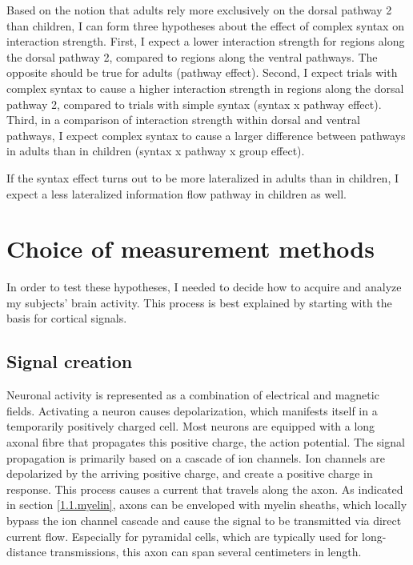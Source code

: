 Based on the notion that adults rely more exclusively on the dorsal pathway 2 than children, I can form three hypotheses about the effect of complex syntax on interaction strength.
First, I expect a lower interaction strength for regions along the dorsal pathway 2, compared to regions along the ventral pathways. The opposite should be true for adults (pathway effect).
Second, I expect trials with complex syntax to cause a higher interaction strength in regions along the dorsal pathway 2, compared to trials with simple syntax (syntax x pathway effect).
Third, in a comparison of interaction strength within dorsal and ventral pathways, I expect complex syntax to cause a larger difference between pathways in adults than in children (syntax x pathway x group effect).

If the syntax effect turns out to be more lateralized in adults than in children, I expect a less lateralized information flow pathway in children as well.\section{Choice of measurement methods}\label{1.5}

In order to test these hypotheses, I needed to decide how to acquire and analyze my subjects' brain activity.
This process is best explained by starting with the basis for cortical signals.

\subsection{Signal creation}
Neuronal activity is represented as a combination of electrical and magnetic fields.
Activating a neuron causes depolarization, which manifests itself in a temporarily positively charged cell.
Most neurons are equipped with a long axonal fibre that propagates this positive charge, the action potential.
The signal propagation is primarily based on a cascade of ion channels.
Ion channels are depolarized by the arriving positive charge, and create a positive charge in response.
This process causes a current that travels along the axon.
As indicated in section \ref{1.1.myelin}, axons can be enveloped with myelin sheaths, which locally bypass the ion channel cascade and cause the signal to be transmitted via direct current flow.
Especially for pyramidal cells, which are typically used for long-distance transmissions, this axon can span several centimeters in length.

